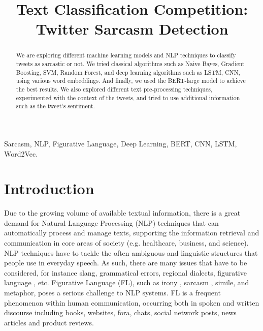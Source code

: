 \documentclass[conference]{IEEEtran}
\begin{document}
\title{Text Classification Competition: Twitter Sarcasm Detection}

\author{
\and
\and
	}

\maketitle

\begin{abstract}
We are exploring different machine learning models and NLP techniques to classify tweets as sarcastic or not. We tried classical algorithms such as Naive Bayes, Gradient Boosting, SVM, Random Forest, and deep learning algorithms such as LSTM, CNN, using various word embeddings. And finally, we used the BERT-large model to achieve the best results. We also explored different text pre-processing techniques, experimented with the context of the tweets, and tried to use additional information such as the tweet's sentiment.
\end{abstract}

\begin{IEEEkeywords}
Sarcasm, NLP, Figurative Language, Deep Learning, BERT, CNN, LSTM, Word2Vec.
\end{IEEEkeywords}

\section{Introduction}

Due to the growing volume of available textual information, there is a great demand for Natural Language Processing (NLP) techniques that can automatically process and manage texts, supporting the information retrieval and communication in core areas of society (e.g. healthcare, business, and science). NLP techniques have to tackle the often ambiguous and linguistic structures that people use in everyday speech. As such, there are many issues that have to be considered, for instance slang, grammatical errors, regional dialects, figurative language , etc. Figurative Language (FL), such as irony , sarcasm , simile, and metaphor, poses a serious challenge to NLP systems. FL is a frequent phenomenon within human communication, occurring both in spoken and written discourse including books, websites, fora, chats, social network posts, news articles and product reviews. \cite{b1}
\end{document}
